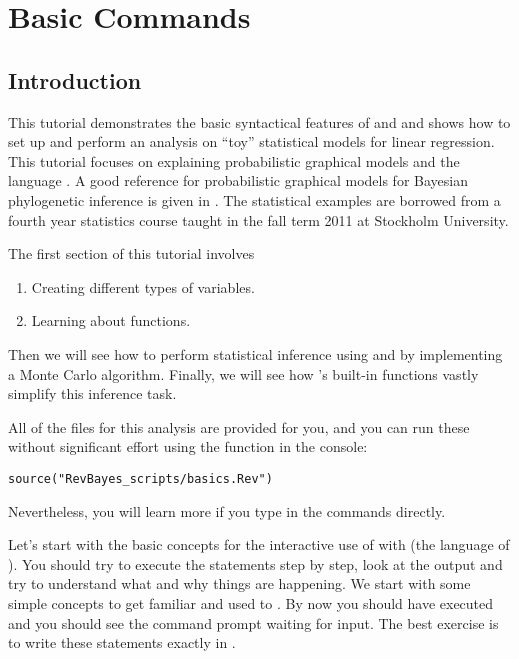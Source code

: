 \section{Basic \Rev Commands}

\subsection{Introduction}

This tutorial demonstrates the basic syntactical features of \RevBayes and \Rev and shows how to set up and perform an analysis on ``toy'' statistical models for linear regression. 
This tutorial focuses on explaining probabilistic graphical models and the language \Rev.
A good reference for probabilistic graphical models for Bayesian phylogenetic inference is given in \cite{Hoehna2014b}.
The statistical examples are borrowed from a fourth year statistics course taught in the fall term 2011 at Stockholm University.

The first section of this tutorial involves 
\begin{enumerate}
\item Creating different types of variables.
\item Learning about functions. 
\end{enumerate}

Then we will see how to perform statistical inference using \RevBayes and \Rev  by implementing a Monte Carlo algorithm. 
Finally, we will see how \RevBayes 's built-in functions vastly simplify this inference task.

All of the files for this analysis are provided for you, and you can run these without significant effort using the  function in the \RevBayes console:
{\tt \begin{snugshade*}
\begin{lstlisting}
source("RevBayes_scripts/basics.Rev")
\end{lstlisting}
\end{snugshade*}}
Nevertheless, you will learn more if you type in the commands directly.

Let's start with the basic concepts for the interactive use of \RevBayes with \Rev (the language of \RevBayes). 
You should try to execute the statements step by step, look at the output and try to understand what and why things are happening. 
We start with some simple concepts to get familiar and used to \RevBayes. 
By now you should have executed \RevBayes and you should see the command prompt waiting for input. 
The best exercise is to write these statements exactly in \RevBayes. 

